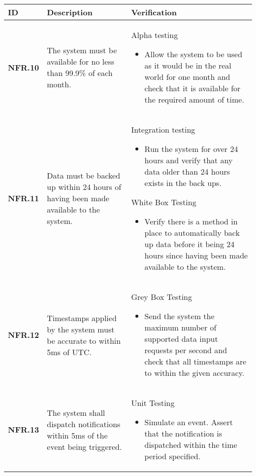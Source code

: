 \begin{table}[h!]
    \begin{tabular}{|p{1.5cm}|p{6.0cm}|p{9.0cm}|}
    \hline
    \textbf{ID} & \textbf{Description} & \textbf{Verification} \\ \hline
    \textbf{NFR.10} & The system must be available for no less than 99.9\% of each month. & Alpha testing\begin{itemize}\item Allow the system to be used as it would be in the real world for one month and check that it is available for the required amount of time.\end{itemize} \\ \hline
    \textbf{NFR.11} & Data must be backed up within 24 hours of having been made available to the system. & Integration testing\begin{itemize}\item Run the system for over 24 hours and verify that any data older than 24 hours exists in the back ups.\end{itemize}White Box Testing\begin{itemize}\item Verify there is a method in place to automatically back up data before it being 24 hours since having been made available to the system.\end{itemize} \\ \hline
    \textbf{NFR.12} & Timestamps applied by the system must be accurate to within 5ms of UTC. & Grey Box Testing\begin{itemize}\item Send the system the maximum number of supported data input requests per second and check that all timestamps are to within the given accuracy.\end{itemize} \\ \hline
    \textbf{NFR.13} & The system shall dispatch notifications within 5ms of the event being triggered. & Unit Testing\begin{itemize}\item Simulate an event. Assert that the notification is dispatched within the time period specified.\end{itemize} \\ \hline
    \end{tabular}
\end{table}
